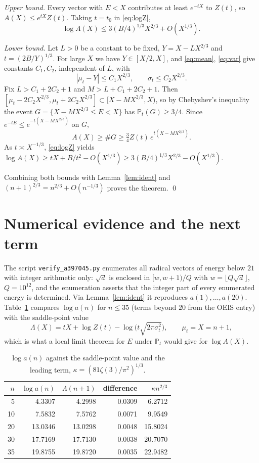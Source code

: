 \documentclass[11pt,a4paper]{article}
\theoremstyle{remark}
\begin{document}
\emph{Upper bound.} Every vector with $E<X$ contributes at least $e^{-tX}$ to $Z(t)$, so $A(X)\le e^{tX}Z(t)$. Taking $t=t_0$ in \eqref{eq:logZ},
\[
 \log A(X)\le 3(B/4)^{1/3}X^{2/3}+O(X^{1/3}).
\]

\emph{Lower bound.} Let $L>0$ be a constant to be fixed, $Y=X-LX^{2/3}$ and $t=(2B/Y)^{1/3}$. For large $X$ we have $Y\in[X/2,X]$, and \eqref{eq:mean}, \eqref{eq:var} give constants $C_1,C_2$, independent of $L$, with
\[
 |\mu_t-Y|\le C_1X^{2/3},\qquad \sigma_t\le C_2X^{2/3}.
\]
Fix $L>C_1+2C_2+1$ and $M>L+C_1+2C_2+1$. Then $[\mu_t-2C_2X^{2/3},\mu_t+2C_2X^{2/3}]\subset[X-MX^{2/3},X)$, so by Chebyshev's inequality the event $G=\{X-MX^{2/3}\le E<X\}$ has $\mathbb P_t(G)\ge3/4$. Since $e^{-tE}\le e^{-t(X-MX^{2/3})}$ on $G$,
\[
 A(X)\ge\#G\ge\tfrac34 Z(t)\,e^{t(X-MX^{2/3})}.
\]
As $t\asymp X^{-1/3}$, \eqref{eq:logZ} yields $\log A(X)\ge tX+B/t^2-O(X^{1/3})\ge3(B/4)^{1/3}X^{2/3}-O(X^{1/3})$.

Combining both bounds with Lemma~\ref{lem:ident} and $(n+1)^{2/3}=n^{2/3}+O(n^{-1/3})$ proves the theorem. \qed

\section{Numerical evidence and the next term}

The script \texttt{verify\_a397045.py} enumerates all radical vectors of energy below $21$ with integer arithmetic only: $\sqrt d$ is enclosed in $[w,w+1)/Q$ with $w=\lfloor Q\sqrt d\rfloor$, $Q=10^{12}$, and the enumeration asserts that the integer part of every enumerated energy is determined. Via Lemma~\ref{lem:ident} it reproduces $a(1),\dots,a(20)$. Table~\ref{tab:num} compares $\log a(n)$ for $n\le35$ (terms beyond $20$ from the OEIS entry) with the saddle-point value
\[
 \Lambda(X)=tX+\log Z(t)-\log\bigl(t\sqrt{2\pi\sigma_t^2}\bigr),\qquad \mu_t=X=n+1,
\]
which is what a local limit theorem for $E$ under $\mathbb P_t$ would give for $\log A(X)$.

\begin{table}[h]
\centering
\begin{tabular}{rrrrr}
\toprule
$n$ & $\log a(n)$ & $\Lambda(n+1)$ & difference & $\kappa n^{2/3}$\\
\midrule
5 & 4.3307 & 4.2998 & 0.0309 & 6.2712\\
10 & 7.5832 & 7.5762 & 0.0071 & 9.9549\\
20 & 13.0346 & 13.0298 & 0.0048 & 15.8024\\
30 & 17.7169 & 17.7130 & 0.0038 & 20.7070\\
35 & 19.8755 & 19.8720 & 0.0035 & 22.9482\\
\bottomrule
\end{tabular}
\caption{$\log a(n)$ against the saddle-point value and the leading term, $\kappa=(81\zeta(3)/\pi^2)^{1/3}$.}\label{tab:num}
\end{table}
\end{document}

